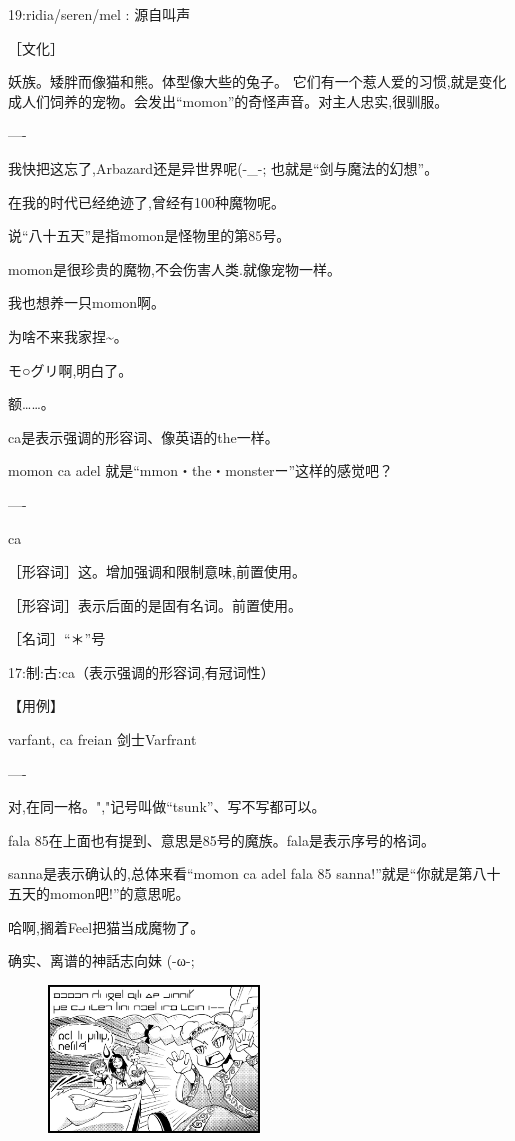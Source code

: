 19:ridia/seren/mel : 源自叫声

［文化］

妖族。矮胖而像猫和熊。体型像大些的兔子。
它们有一个惹人爱的习惯,就是变化成人们饲养的宠物。会发出``momon''的奇怪声音。对主人忠实,很驯服。

----

我快把这忘了,Arbazard还是异世界呢(-_-; 也就是``剑与魔法的幻想''。

在我的时代已经绝迹了,曾经有100种魔物呢。

说``八十五天''是指momon是怪物里的第85号。

momon是很珍贵的魔物,不会伤害人类.就像宠物一样。

我也想养一只momon啊。

为啥不来我家捏\~{}。


モ○グリ啊,明白了。


额……。


ca是表示强调的形容词、像英语的the一样。

momon ca adel 就是``mmon・the・monsterー\Fivestar''这样的感觉吧？

----

ca

［形容词］这。增加强调和限制意味,前置使用。

［形容词］表示后面的是固有名词。前置使用。

［名词］``＊''号

17:制:古:ca（表示强调的形容词,有冠词性）

【用例】

varfant, ca freian 剑士Varfrant

----


对,在同一格。","记号叫做``tsunk''、写不写都可以。

fala 85在上面也有提到、意思是85号的魔族。fala是表示序号的格词。


sanna是表示确认的,总体来看``momon ca adel fala 85 sanna!''就是``你就是第八十五天的momon吧!''的意思呢。

哈啊,搁着Feel把猫当成魔物了。

确实、离谱的神話志向妹 (-ω-;

\begin{figure}[H]
\includegraphics[width=0.5\textwidth]{ARKA/uni4.png}%
\end{figure}



